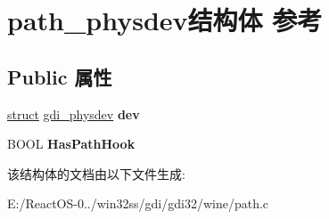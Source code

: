 \hypertarget{structpath__physdev}{}\section{path\+\_\+physdev结构体 参考}
\label{structpath__physdev}
\subsection*{Public 属性}
\begin{DoxyCompactItemize}
\item 
\mbox{\label{structpath__physdev_a98bd50256d332abf4aea0f51f0bfe7e1}} 
\hyperlink{interfacestruct}{struct} \hyperlink{structgdi__physdev}{gdi\+\_\+physdev} {\bfseries dev}
\item 
\mbox{\label{structpath__physdev_a80641af668d1df6342c0228dd2771444}} 
B\+O\+OL {\bfseries Has\+Path\+Hook}
\end{DoxyCompactItemize}


该结构体的文档由以下文件生成\+:\begin{DoxyCompactItemize}
\item 
E\+:/\+React\+O\+S-\/0../win32ss/gdi/gdi32/wine/path.\+c\end{DoxyCompactItemize}
